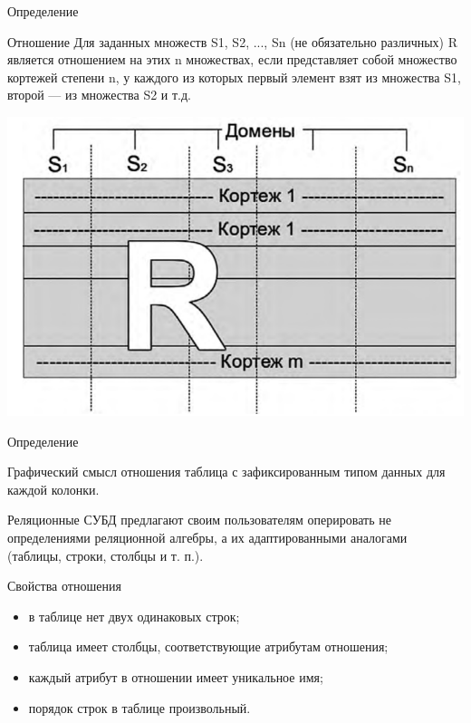 \documentclass{beamer}
\begin{document}
\begin{frame}{Определение}
\begin{block}{Отношение}
Для заданных множеств S1, S2, ..., Sn (не обязательно различных) R является отношением на этих n множествах, если представляет собой множество кортежей степени n, у каждого из которых первый элемент взят из множества S1, второй — из множества S2 и т.д. 
\end{block}
\begin{center}
\includegraphics[scale=0.35]{images/rel-01.png}
\end{center}
\end{frame} 

\begin{frame}{Определение}
\begin{block}{Графический смысл отношения}
таблица с зафиксированным типом данных для каждой колонки. 
\end{block}
Реляционные СУБД предлагают своим пользователям оперировать не определениями реляционной алгебры, а их адаптированными аналогами (таблицы, строки, столбцы и т. п.).
\begin{block}{Свойства отношения}
\begin{itemize}
\item в таблице нет двух одинаковых строк;
\item таблица имеет столбцы, соответствующие атрибутам отношения;
\item каждый атрибут в отношении имеет уникальное имя;
\item порядок строк в таблице произвольный.
\end{itemize}
\end{block}
\end{frame}
\end{document}
